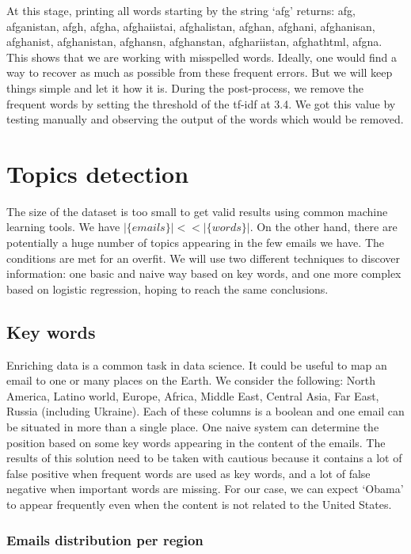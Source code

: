 \documentclass[11pt]{article}
\begin{document}
At this stage, printing all words starting by the string `afg' returns: afg, afganistan, afgh, afgha, afghaiistai, afghalistan, afghan, afghani, afghanisan, afghanist, afghanistan, afghansn, afghanstan, afghariistan, afghathtml, afgna. This shows that we are working with misspelled words. Ideally, one would find a way to recover as much as possible from these frequent errors. But we will keep things simple and let it how it is. During the post-process, we remove the frequent words by setting the threshold of the tf-idf at 3.4. We got this value by testing manually and observing the output of the words which would be removed.

\section{Topics detection}

The size of the dataset is too small to get valid results using common machine learning tools. We have $|\{ emails \}| << |\{ words \}|$. On the other hand, there are potentially a huge number of topics appearing in the few emails we have. The conditions are met for an overfit. We will use two different techniques to discover information: one basic and naive way based on key words, and one more complex based on logistic regression, hoping to reach the same conclusions.

\subsection{Key words}

Enriching data is a common task in data science. It could be useful to map an email to one or many places on the Earth. We consider the following: North America, Latino world, Europe, Africa, Middle East, Central Asia, Far East, Russia (including Ukraine). Each of these columns is a boolean and one email can be situated in more than a single place. One naive system can determine the position based on some key words appearing in the content of the emails. The results of this solution need to be taken with cautious because it contains a lot of false positive when frequent words are used as key words, and a lot of false negative when important words are missing. For our case, we can expect `Obama' to appear frequently even when the content is not related to the United States.

\subsubsection{Emails distribution per region}
\end{document}
